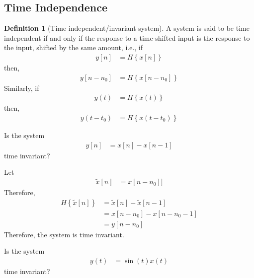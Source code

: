 \documentclass[titlepage, fleqn, a4paper, 12pt, twoside]{article}
\theoremstyle{definition}
\newtheorem{definition}{Definition}
\theoremstyle{theorem}
\renewcommand{\tilde}{\widetilde}
\begin{document}
\subsection{Time Independence}

\begin{definition}[Time independent/invariant system]
	A system is said to be time independent if and only if the response to a time-shifted input is the response to the input, shifted by the same amount, i.e., if
	\begin{align*}
		y[n] & = H\left\{ x[n] \right\}
	\end{align*}
	then,
	\begin{align*}
		y[n - n_0] & = H\left\{ x[n - n_0] \right\}
	\end{align*}
	Similarly, if
	\begin{align*}
		y(t) & = H\left\{ x(t) \right\}
	\end{align*}
	then,
	\begin{align*}
		y(t - t_0) & = H\left\{ x(t - t_0) \right\}
	\end{align*}
\end{definition}

\begin{question}
	Is the system
	\begin{align*}
		y[n] & = x[n] - x[n - 1]
	\end{align*}
	time invariant?
\end{question}

\begin{solution}
	Let
	\begin{align*}
		\tilde{x}[n] & = x[n - n_0]]
	\end{align*}
	Therefore,
	\begin{align*}
		H\left\{ \tilde{x}[n] \right\} & = \tilde{x}[n] - \tilde{x}[n - 1] \\
                                               & = x[n - n_0] - x[n - n_0 - 1]     \\
                                               & = y[n - n_0]
	\end{align*}
	Therefore, the system is time invariant.
\end{solution}

\begin{question}
	Is the system
	\begin{align*}
		y(t) & = \sin(t) x(t)
	\end{align*}
	time invariant?
\end{question}
\end{document}
